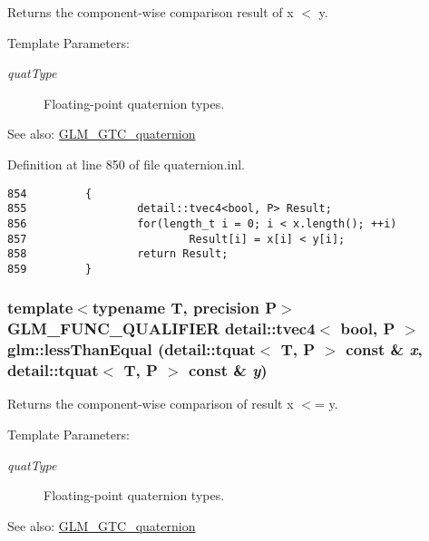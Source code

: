 Returns the component-wise comparison result of x $<$ y.

\begin{Desc}
\item[Template Parameters:]
\begin{description}
\item[{\em quatType}]Floating-point quaternion types.\end{description}
\end{Desc}
\begin{Desc}
\item[See also:]\hyperlink{group__gtc__quaternion}{GLM\_\-GTC\_\-quaternion} \end{Desc}


Definition at line 850 of file quaternion.inl.

\begin{Code}\begin{verbatim}854         {
855                 detail::tvec4<bool, P> Result;
856                 for(length_t i = 0; i < x.length(); ++i)
857                         Result[i] = x[i] < y[i];
858                 return Result;
859         }
\end{verbatim}
\end{Code}


\hypertarget{group__gtc__quaternion_g43f2f8f0e9b252966c72f357fc834184}{
\subsubsection[lessThanEqual]{\setlength{\rightskip}{0pt plus 5cm}template$<$typename T, precision P$>$ GLM\_\-FUNC\_\-QUALIFIER detail::tvec4$<$ bool, P $>$ glm::lessThanEqual (detail::tquat$<$ T, P $>$ const \& {\em x}, \/  detail::tquat$<$ T, P $>$ const \& {\em y})}}
\label{group__gtc__quaternion_g43f2f8f0e9b252966c72f357fc834184}


Returns the component-wise comparison of result x $<$= y.

\begin{Desc}
\item[Template Parameters:]
\begin{description}
\item[{\em quatType}]Floating-point quaternion types.\end{description}
\end{Desc}
\begin{Desc}
\item[See also:]\hyperlink{group__gtc__quaternion}{GLM\_\-GTC\_\-quaternion} \end{Desc}


